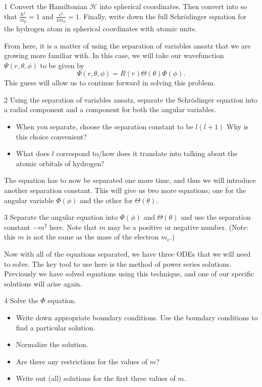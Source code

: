 \documentclass{article}
\newcommand{\hamiltonian}{\mathcal{H}}
\begin{document}
\begin{problem}{}{1}
Convert the Hamiltonian $\hamiltonian$ into spherical coordinates.  Then convert into  so that $\frac{\hbar^2}{m_p}=1$ and $\frac{e^2}{4\pi \epsilon_0}=1$.  Finally, write down the full Schr\"odinger equation for the hydrogen atom in spherical coordinates with atomic units.
\end{problem}
\noindent From here, it is a matter of using the separation of variables ansatz that we are growing more familiar with.  In this case, we will take our wavefunction $\Psi(r,\theta,\phi)$ to be given by
\[
\Psi(r,\theta,\phi) = R(r) \Theta(\theta) \Phi(\phi).
\]
This guess will allow us to continue forward in solving this problem.
\begin{problem}{}{2}
Using the separation of variables ansatz, separate the Schr\"odinger equation into a radial component and a component for both the angular variables.
\begin{itemize}
    \item When you separate, choose the separation constant to be $l(l+1)$ Why is this choice convenient?
    \item What does $l$ correspond to/how does it translate into talking about the atomic orbitals of hydrogen?
\end{itemize}
\end{problem}
\noindent The equation has to now be separated one more time, and thus we will introduce another separation constant.  This will give us two more equations; one for the angular variable $\Phi(\phi)$ and the other for $\Theta(\theta)$.

\begin{problem}{}{3}
Separate the angular equation into $\Phi(\phi)$ and $\Theta(\theta)$ and use the separation constant $-m^2$ here.  Note that $m$ may be a positive or negative number.  (Note: this $m$ is not the same as the mass of the electron $m_e$.)
\end{problem}

\noindent Now with all of the equations separated, we have three ODEs that we will need to solve. The key tool to use here is the method of power series solutions.  Previously we have solved equations using this technique, and one of our specific solutions will arise again.

\begin{problem}{}{4}
Solve the $\Phi$ equation.
\begin{itemize}
    \item Write down appropriate boundary conditions. Use the boundary conditions to find a particular solution.
    \item Normalize the solution.
    \item Are there any restrictions for the values of $m$?
    \item Write out (all) solutions for the first three values of $m$.
\end{itemize}
\end{problem}
\end{document}
